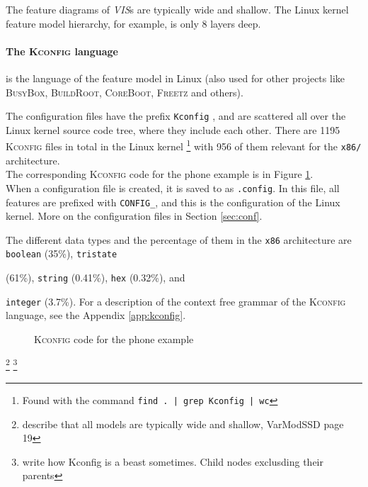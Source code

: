 \documentclass[a4paper,11pt]{report}
\newcommand{\textcode}[1]{
    \fboxsep=1pt
    \texttt{\colorbox{gray!20}{#1}}
}
\newcommand{\figa}{
    \begin{figure}[!htpb]
    \centering
}
\newcommand{\figb}[2]{
    \caption{#1}
    \label{#2}
    \end{figure}
}
\begin{document}
The feature diagrams of \emph{VIS}s are typically wide and shallow. The Linux 
kernel feature model hierarchy, for example, is only 8 layers deep\cite[p. 
17]{VarModSSD}.


            \paragraph{The \textsc{Kconfig} language} 
is the language of the feature model in Linux (also used for other projects 
like \textsc{BusyBox}, \textsc{BuildRoot}, \textsc{CoreBoot}, \textsc{Freetz} 
and others)\cite[p. 4]{VarModSSD}.

The configuration files have the prefix \textcode{Kconfig}, and are 
scattered all over the Linux kernel source code tree, where they include each 
other. There are 1195 \textsc{Kconfig} files in total in the Linux kernel
    \footnote{Found with the command \textcode{find . | grep Kconfig | wc}}
with 956 of them relevant for the \texttt{x86/} architecture.
\\

The corresponding \textsc{Kconfig} code for the phone example is in Figure 
\ref{kconfigphone}.
\\

When a configuration file is created, it is saved to as \texttt{.config}.
In this file, all features are prefixed with \texttt{CONFIG\_}, and this is
the configuration of the Linux kernel. More on the configuration files in
Section  \ref{sec:conf}.

The different data types and the percentage of them in the \texttt{x86} 
architecture are \textcode{boolean} (35\%), \textcode{tristate} 
(61\%), \textcode{string} (0.41\%), \textcode{hex} (0.32\%), and 
\textcode{integer} (3.7\%). For a description of the context free grammar of 
the \textsc{Kconfig} language, see the Appendix \ref{app:kconfig}.


\figa
    
\figb{\textsc{Kconfig} code for the phone example}{kconfigphone}


        \footnote{describe that all models are typically wide and shallow, 
        VarModSSD page 19}
        \footnote{write how Kconfig is a beast sometimes. Child nodes exclusding 
        their parents}

\end{document}

